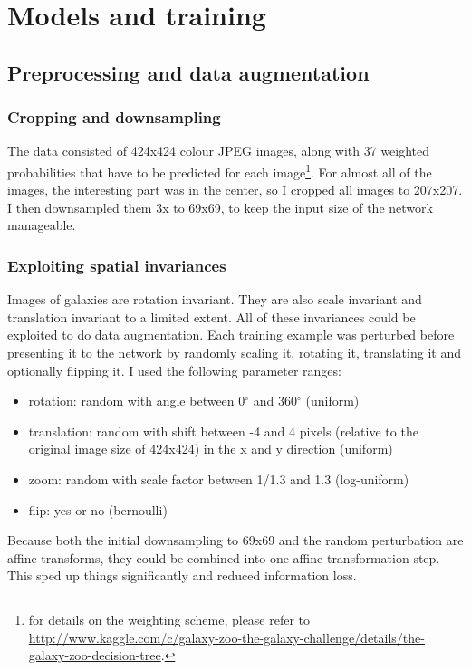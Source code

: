 \documentclass[a4paper,10pt]{article}
\begin{document}
\section{Models and training}

\subsection{Preprocessing and data augmentation}

\subsubsection{Cropping and downsampling}

The data consisted of 424x424 colour JPEG images, along with 37 weighted probabilities that have to be predicted for each image\footnote{for details on the weighting scheme, please refer to \url{http://www.kaggle.com/c/galaxy-zoo-the-galaxy-challenge/details/the-galaxy-zoo-decision-tree}.}. For almost all of the images, the interesting part was in the center, so I cropped all images to 207x207. I then downsampled them 3x to 69x69, to keep the input size of the network manageable.

\subsubsection{Exploiting spatial invariances}

Images of galaxies are rotation invariant. They are also scale invariant and translation invariant to a limited extent. All of these invariances could be exploited to do data augmentation. Each training example was perturbed before presenting it to the network by randomly scaling it, rotating it, translating it and optionally flipping it. I used the following parameter ranges:

\begin{itemize}
 \item{rotation:} random with angle between 0$^\circ$ and 360$^\circ$ (uniform)
 \item{translation:} random with shift between -4 and 4 pixels (relative to the original image size of 424x424) in the x and y direction (uniform)
 \item{zoom:} random with scale factor between 1/1.3 and 1.3 (log-uniform)
 \item{flip:} yes or no (bernoulli)
\end{itemize}

Because both the initial downsampling to 69x69 and the random perturbation are affine transforms, they could be combined into one affine transformation step. This sped up things significantly and reduced information loss.
\end{document}
